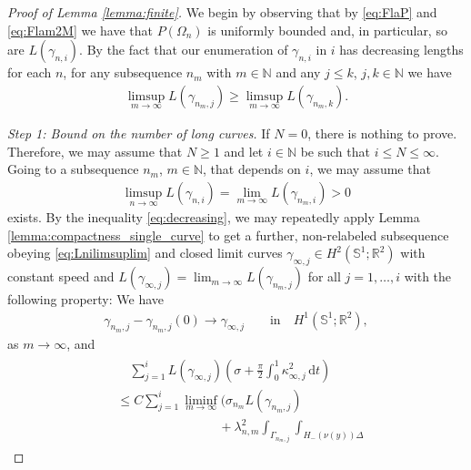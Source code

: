 \documentclass[11pt]{article}
\numberwithin{statement}{section}
\numberwithin{equation}{section}
\theoremstyle{remark}
\newcommand{\R}{\mathbb R} 				%
\newcommand{\N}{\mathbb N}
\newcommand{\intd}{\, \mathrm{d}} 				%
\newcommand{\Sph}{{\mathbb S}}				%
\begin{document}
\begin{proof}[Proof of Lemma \ref{lemma:finite}]
  We begin by observing that by \eqref{eq:FlaP} and
    \eqref{eq:Flam2M} we have that $P(\Omega_n)$ is uniformly bounded
    and, in particular, so are $L(\gamma_{n,i})$. By the fact that
  our enumeration of $\gamma_{n,i}$ in $i$ has decreasing lengths for
  each $n$, for any subsequence $n_m$ with $m \in \N$ and any
  $j\leq k$, $j,k\in \N$ we have
	\begin{align}\label{eq:decreasing}
          \limsup_{m\to \infty} L( \gamma_{n_m,j}) \geq \limsup_{m\to
          \infty} L( \gamma_{n_m,k}). 
	\end{align}
        
        
        \textit{Step 1: Bound on the number of long curves.}  If
        $N=0$, there is nothing to prove. Therefore, we may assume
        that $N \geq 1$ and let $i \in \N$ be such that
        $i \leq N \leq \infty$.  Going to a subsequence $n_m$,
        $m \in \N$, that depends on $i$, we may assume that
	\begin{align}
          \label{eq:Lnilimsuplim}
          \limsup_{n \to \infty} L( \gamma_{n,i}) = \lim_{m \to
          \infty} L( \gamma_{n_m,i}) >0 
	\end{align}
        exists.  By the inequality \eqref{eq:decreasing}, we may
        repeatedly apply Lemma
        \ref{lemma:compactness_single_curve}
	to get a further, non-relabeled subsequence obeying
          \eqref{eq:Lnilimsuplim} and closed limit curves
        $ \gamma_{\infty,j} \in H^2(\Sph^1;\R^2)$ with constant speed
        and
        $L( \gamma_{\infty,j}) = \lim_{m \to \infty}
          L(\gamma_{n_m,j})$ for all $j =1,\ldots,i$ with the
          following property: We have 
	\begin{align}
          \gamma_{n_m,j} - \gamma_{n_m,j}(0) \to
          \gamma_{\infty,j} \qquad  \text{in} \quad H^1(\Sph^1;
          \R^2),
	\end{align}
       as $m \to \infty$, and
	\begin{align}
	  \begin{split}
            & \quad \sum_{j=1}^i L( \gamma_{\infty,j}) \left(\sigma
              +\frac{\pi}{2} \int_0^1  \kappa_{\infty,j}^ 2 \intd
              t\right)\\ 
            & \leq C \sum_{j=1}^i \liminf_{m \to \infty} \Bigg(
            \sigma_{n_m} L( \gamma_{n_m,j})\\
            & \qquad \qquad \qquad \qquad + \lambda_{n,m}^2 \int_{
              \Gamma_{n_m,j}} \int_{ H_-(\nu(y)) \Delta
}
\end{split}
\end{align}
\end{proof}
\end{document}

